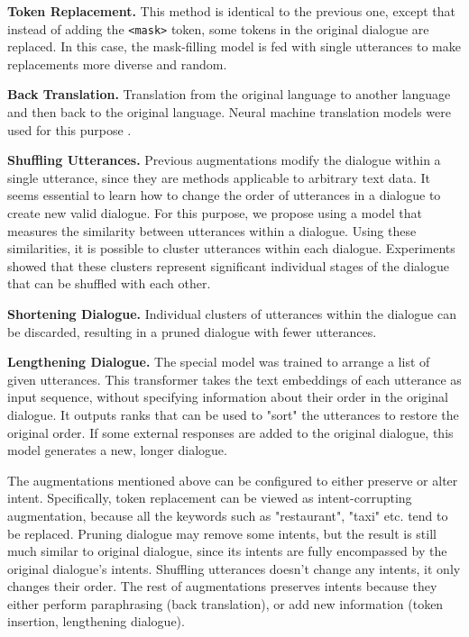 \documentclass{article}
\begin{document}
\textbf{Token Replacement.} This method is identical to the previous one, except that instead of adding the \texttt{<mask>} token, some tokens in the original dialogue are replaced. In this case, the mask-filling model is fed with single utterances to make replacements more diverse and random.

\textbf{Back Translation.} Translation from the original language to another language and then back to the original language. Neural machine translation models were used for this purpose \cite{TiedemannThottingal}.

\textbf{Shuffling Utterances.} Previous augmentations modify the dialogue within a single utterance, since they are methods applicable to arbitrary text data. It seems essential to learn how to change the order of utterances in a dialogue to create new valid dialogue. For this purpose, we propose using a model that measures the similarity between utterances within a dialogue. Using these similarities, it is possible to cluster utterances within each dialogue. Experiments showed that these clusters represent significant individual stages of the dialogue that can be shuffled with each other.

\textbf{Shortening Dialogue.} Individual clusters of utterances within the dialogue can be discarded, resulting in a pruned dialogue with fewer utterances.

\textbf{Lengthening Dialogue.} The special model was trained to arrange a list of given utterances. This transformer takes the text embeddings of each utterance as input sequence, without specifying information about their order in the original dialogue. It outputs ranks that can be used to "sort" the utterances to restore the original order. If some external responses are added to the original dialogue, this model generates a new, longer dialogue.

The augmentations mentioned above can be configured to either preserve or alter intent. Specifically, token replacement can be viewed as intent-corrupting augmentation, because all the keywords such as "restaurant", "taxi" etc. tend to be replaced. Pruning dialogue may remove some intents, but the result is still much similar to original dialogue, since its intents are fully encompassed by the original dialogue's intents. 
Shuffling utterances doesn't change any intents, it only changes their order. The rest of augmentations preserves intents because they either perform paraphrasing (back translation), or add new information (token insertion, lengthening dialogue).
\end{document}
